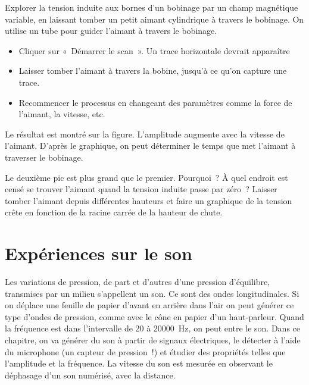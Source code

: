 \documentclass[a4paper,12pt,french]{sphinxmanual}
\let\sphinxpxdimen\pdfpxdimen\else\newdimen\sphinxpxdimen
\begin{document}
Explorer la tension induite aux bornes d’un bobinage par un champ
magnétique variable, en laissant tomber un petit aimant cylindrique à
travers le bobinage. On utilise un tube pour guider l’aimant à travers
le bobinage.

\noindent\sphinxincludegraphics[width=300\sphinxpxdimen]{{induction}.pdf}
\noindent\sphinxincludegraphics[width=300\sphinxpxdimen]{{induction-screen}.pdf}

\begin{itemize}
\item {} 
Cliquer sur « Démarrer le scan ». Un trace horizontale devrait
apparaître

\item {} 
Laisser tomber l’aimant à travers la bobine, jusqu’à ce qu’on capture
une trace.

\item {} 
Recommencer le processus en changeant des paramètres comme la force
de l’aimant, la vitesse, etc.

\end{itemize}


Le résultat est montré sur la figure. L’amplitude augmente avec la
vitesse de l’aimant. D’après le graphique, on peut déterminer le temps
que met l’aimant à traverser le bobinage.

Le deuxième pic est plus grand que le premier. Pourquoi ? À quel endroit
est censé se trouver l’aimant quand la tension induite passe par zéro ?
Laisser tomber l’aimant depuis différentes hauteurs et faire un
graphique de la tension crête en fonction de la racine carrée de la
hauteur de chute.


\chapter{Expériences sur le son}
\label{\detokenize{index:experiences-sur-le-son}}
Les variations de pression, de part et d’autres d’une pression
d’équilibre, transmises par un milieu s’appellent un son. Ce sont des
ondes longitudinales. Si on déplace une feuille de papier d’avant en
arrière dans l’air on peut générer ce type d’ondes de pression, comme
avec le cône en papier d’un haut-parleur. Quand la fréquence est dans
l’intervalle de 20 à 20000 Hz, on peut entre le son. Dans ce chapitre,
on va générer du son à partir de signaux électriques, le détecter à
l’aide du microphone (un capteur de pression !) et étudier des
propriétés telles que l’amplitude et la fréquence. La vitesse du son
est mesurée en observant le déphasage d’un son numérisé, avec la
distance.
\end{document}
